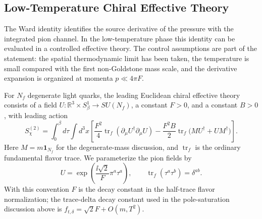 \subsection{Low-Temperature Chiral Effective Theory}
\label{subsec:qcd-low-temperature-chiral-effective-theory}

The Ward identity identifies the source derivative of the pressure with the
integrated pion channel.  In the low-temperature phase this identity can be
evaluated in a controlled effective theory.  The control assumptions are
part of the statement: the spatial thermodynamic limit has been taken, the
temperature is small compared with the first non-Goldstone mass scale, and
the derivative expansion is organized at momenta \(p\ll 4\pi F\).

\begin{definition}
\label{def:qcd-leading-chiral-effective-theory}
For \(N_f\) degenerate light quarks, the leading Euclidean chiral effective
theory consists of a field \(U:\mathbb R^3\times S^1_\beta\to SU(N_f)\), a
constant \(F>0\), and a constant \(B>0\), with leading action
\begin{equation}
  S_{\chi}^{(2)}
  =
  \int_0^\beta d\tau\int d^3x
  \left[
    \frac{F^2}{4}
    \operatorname{tr}_f(\partial_\mu U^\dagger\partial_\mu U)
    -
    \frac{F^2B}{2}
    \operatorname{tr}_f\bigl(MU^\dagger+UM^\dagger\bigr)
  \right].
  \label{eq:qcd-leading-chiral-effective-action}
\end{equation}
Here \(M=m\mathbf1_{N_f}\) for the degenerate-mass discussion, and
\(\operatorname{tr}_f\) is the ordinary fundamental flavor trace.  We
parameterize the pion fields by
\begin{equation}
  U=\exp\left(\frac{\ii\sqrt2}{F}\pi^a\tau^a\right),
  \qquad
  \operatorname{tr}_f(\tau^a\tau^b)=\delta^{ab}.
  \label{eq:qcd-chiral-field-parameterization}
\end{equation}
With this convention \(F\) is the decay constant in the half-trace flavor
normalization; the trace-delta decay constant used in the pole-saturation
discussion above is
\(f_{t,\delta}=\sqrt2F+O(m,T^2)\).
\end{definition}


